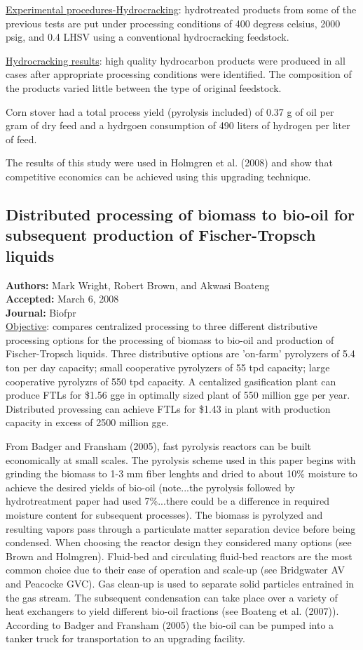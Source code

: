 \documentclass{article}\usepackage[]{graphicx}\usepackage[]{color}
\begin{document}
\underline{Experimental procedures-Hydrocracking}: hydrotreated products from some of the previous tests are put under processing conditions of 400 degress celsius, 2000 psig, and 0.4 LHSV using a conventional hydrocracking feedstock.  

\underline{Hydrocracking results}:  high quality hydrocarbon products were produced in all cases after appropriate processing conditions were identified.  The composition of the products varied little between the type of original feedstock.  

Corn stover had a total process yield (pyrolysis included) of 0.37 g of oil per gram of dry feed and a hydrgoen consumption of 490 liters of hydrogen per liter of feed.

The results of this study were used in Holmgren et al. (2008) and show that competitive economics can be achieved using this upgrading technique.

\subsection{Distributed processing of biomass to bio-oil for subsequent production of Fischer-Tropsch liquids}
\textbf{Authors:} Mark Wright, Robert Brown, and Akwasi Boateng \\
\textbf{Accepted:} March 6, 2008 \\
\textbf{Journal:} Biofpr \\

\underline{Objective}: compares centralized processing to three different distributive processing options for the processing of biomass to bio-oil and production of Fischer-Tropsch liquids.  Three distributive options are 'on-farm' pyrolyzers of 5.4 ton per day capacity; small cooperative pyrolyzers of 55 tpd capacity; large cooperative pyrolyzrs of 550 tpd capacity.  A centalized gasification plant can produce FTLs for \$1.56 gge in optimally sized plant of 550 million gge per year.  Distributed provessing can achieve FTLs for \$1.43 in plant with production capacity in excess of 2500 million gge.

From Badger and Fransham (2005), fast pyrolysis reactors can be built economically at small scales.  The pyrolysis scheme used in this paper begins with grinding the biomass to 1-3 mm fiber lenghts and dried to about 10\% moisture to achieve the desired yields of bio-oil (note...the pyrolysis followed by hydrotreatment paper had used 7\%...there could be a difference in required moisture content for subsequent processes).  The biomass is pyrolyzed and resulting vapors pass through a particulate matter separation device before being condensed.  When choosing the reactor design they considered many options (see Brown and Holmgren).  Fluid-bed and circulating fluid-bed reactors are the most common choice due to their ease of operation and scale-up (see Bridgwater AV and Peacocke GVC).  Gas clean-up is used to separate solid particles entrained in the gas stream.  The subsequent condensation can take place over a variety of heat exchangers to yield different bio-oil fractions (see Boateng et al. (2007)).  According to Badger and Fransham (2005) the bio-oil can be pumped into a tanker truck for transportation to an upgrading facility.
\end{document}
